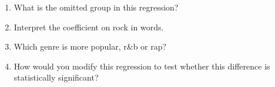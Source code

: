 \documentclass[12pt]{article}
\begin{document}
\begin{enumerate}
  \begin{enumerate}
    \item What is the omitted group in this regression?

    \item Interpret the coefficient on rock in words.
    
    \item Which genre is more popular, r\&b or rap?

    \item How would you modify this regression to test whether this difference is statistically significant?
  \end{enumerate}
\end{enumerate}
\end{document}
